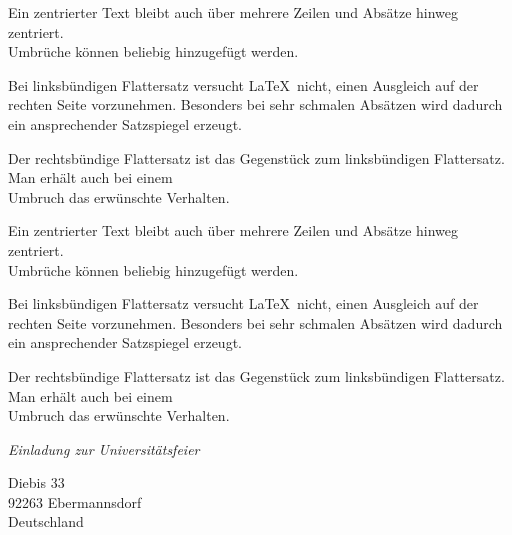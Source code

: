 \documentclass[a4paper, 12pt]{article} %
\begin{document}

\begin{center}Ein zentrierter Text bleibt auch über mehrere
    Zeilen und Absätze hinweg zentriert.\\
    Umbrüche können beliebig hinzugefügt werden.\end{center}
\begin{flushleft}Bei linksbündigen Flattersatz versucht \LaTeX\
    nicht, einen Ausgleich auf der rechten Seite vorzunehmen.
    Besonders bei sehr schmalen Absätzen wird dadurch ein
    ansprechender Satzspiegel erzeugt.\end{flushleft}
\begin{flushright}Der rechtsbündige Flattersatz ist das Gegenstück
    zum linksbündigen Flattersatz. Man erhält auch bei einem\\
    Umbruch das erwünschte Verhalten.\end{flushright}
\par{\centering Ein zentrierter Text bleibt auch über mehrere
Zeilen und Absätze hinweg zentriert.\\
Umbrüche können beliebig hinzugefügt werden.\par}
{\raggedright Bei linksbündigen Flattersatz versucht \LaTeX\
nicht, einen Ausgleich auf der rechten Seite vorzunehmen.
Besonders bei sehr schmalen Absätzen wird dadurch ein
ansprechender Satzspiegel erzeugt.\par}
{\raggedleft Der rechtsbündige Flattersatz ist das Gegenstück
zum linksbündigen Flattersatz. Man erhält auch bei einem\\
Umbruch das erwünschte Verhalten.\par}

\begin{center} {\large\itshape Einladung zur Universitätsfeier} \end{center}

\begin{flushright} \textsf{Diebis 33\\
    92263 Ebermannsdorf\\
    Deutschland}
\end{flushright}
\end{document}
